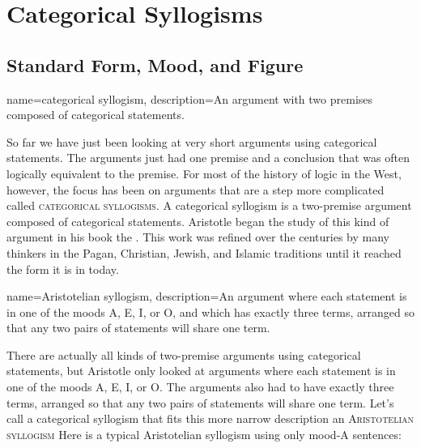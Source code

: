 \chapter{Categorical Syllogisms}
\label{chap:cat_syllogisms}
\setlength{\parindent}{1em}



\section{Standard Form, Mood, and Figure}
\label{sec:form_mood_figure}
{
name=categorical syllogism,
description={An argument with two premises composed of categorical statements.}
}


So far we have just been looking at very short arguments using categorical statements. The arguments just had one premise and a conclusion that was often logically equivalent to the premise. For most of the history of logic in the West, however, the focus has been on arguments that are a step more complicated called \textsc{\glspl{categorical syllogism}}. A categorical syllogism is a two-premise argument composed of categorical statements. Aristotle began the study of this kind of argument in his book the \cite*{Aristotle:prior}. This work was refined over the centuries by many thinkers in the Pagan, Christian, Jewish, and Islamic traditions until it reached the form it is in today.

{
name=Aristotelian syllogism,
description={An argument where each statement is in one of the moods A, E, I, or O, and which has exactly three terms, arranged so that any two pairs of statements will share one term.}
}


There are actually all kinds of two-premise arguments using categorical statements, but Aristotle only looked at arguments where each statement is in one of the moods A, E, I, or O. The arguments also had to have exactly three terms, arranged so that any two pairs of statements will share one term. Let's call a categorical syllogism that fits this more narrow description an \textsc{\gls{Aristotelian syllogism}} Here is a typical Aristotelian syllogism using only mood-A sentences:

